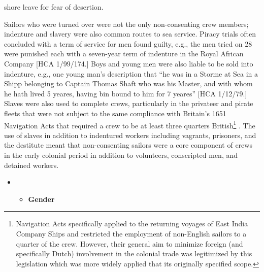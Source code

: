 shore leave for fear of desertion. 

Sailors who were turned over were not the only non-consenting crew members; indenture and slavery were also common routes to sea service. Piracy trials often concluded with a term of service for men found guilty, e.g., the men tried on 28 \citealt{March1722} were punished each with a seven-year term of indenture in the Royal African Company [HCA 1/99/174.] Boys and young men were also liable to be sold into indenture, e.g., one young man’s description that “he was in a Storme at Sea in a Shipp belonging to Captain Thomas Shaft who was his Master, and with whom he hath lived 5 yeares, having bin bound to him for 7 yeares” [HCA 1/12/79.] Slaves were also used to complete crews, particularly in the privateer and pirate fleets that were not subject to the same compliance with Britain's 1651 Navigation Acts that required a crew to be at least three quarters British\footnote{\citealt{The1651} Navigation Acts specifically applied to the returning voyages of East India Company Ships and restricted the employment of non-English sailors to a quarter of the crew. However, their general aim to minimize foreign (and specifically Dutch) involvement in the colonial trade was legitimized by this legislation which was more widely applied that its originally specified scope.} . The use of slaves in addition to indentured workers including vagrants, prisoners, and the destitute meant that non-consenting sailors were a core component of crews in the early colonial period in addition to volunteers, conscripted men, and detained workers. 


\begin{itemize}
\item 
\begin{itemize}
\item \textbf{Gender}
\end{itemize}
\end{itemize}

